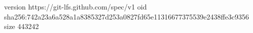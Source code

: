 version https://git-lfs.github.com/spec/v1
oid sha256:742a23a6a528a1a8385327d253a0827fd65e11316677375539e2438ffe3c9356
size 443242
